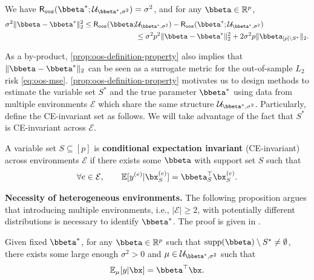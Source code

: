 \documentclass[10pt]{article}
\numberwithin{equation}{section}
\newcommand*{\supp}{\mathrm{supp}}
\newcommand{\aosversion}[2]{\iftoggle{vaos}{#1}{#2}}
\newcommand{\blue}[1]{{\color{blue} #1}}
\begin{document}
{\begin{proposition} \label{prop:oos-definition-property} We have $\mathsf{R}_{\mathtt{oos}}(\bbeta^*;\mathcal{U}_{\bbeta^*, \sigma^2})=\sigma^2$, and for any $\bbeta \in \mathbb{R}^p$,
\begin{align}
\label{eq:optimal-beta-s-star}
\begin{split}
\sigma^2 \|\bbeta - \bbeta^*\|_2^2 \le \mathsf{R}_{\mathtt{oos}}(\bbeta;&\mathcal{U}_{\bbeta^*,\sigma^2}) - \mathsf{R}_{\mathtt{oos}}(\bbeta^*;\mathcal{U}_{\bbeta^*, \sigma^2}) \\
&\le \sigma^2 p^2 \|\bbeta-\bbeta^*\|_2^2 + 2 \sigma^2 p \|\bbeta_{[p]\setminus S^*}\|_2.
\end{split}
\end{align}
\end{proposition}
As a by-product, \cref{prop:oos-definition-property} also implies that $\|\bbeta - \bbeta^*\|_2$ can be seen as a surrogate metric for the out-of-sample $L_2$ risk \eqref{eq:oos-mse}. \cref{prop:oos-definition-property} motivates us to design methods to estimate the variable set $S^*$  and the true parameter $\bbeta^*$  using data from multiple environments $\mathcal{E}$ which share the same structure $\mathcal{U}_{\bbeta^*,\sigma^2}$. Particularly, define the CE-invariant set as follows. We will take advantage of the fact that $S^*$ is CE-invariant across $\mathcal{E}$.

\begin{definition} A variable set $S \subseteq [p]$ is \textbf{conditional expectation invariant} (CE-invariant) across environments $\mathcal{E}$ if there exists some $\bbeta$ with support set $S$ such that
\begin{align}
\label{eq:ce-invariant}
    \forall e\in \mathcal{E}, ~~~~~~ \mathbb{E} [y^{(e)}|\bx_{S}^{(e)}] = \bbeta_S^\top \bx_{S}^{(e)}.
\end{align}
\end{definition} 

\noindent \textbf{Necessity of heterogeneous environments. } The following proposition argues that introducing multiple environments, i.e., $|\mathcal{E}| \ge 2$, with potentially different distributions is necessary to identify $\bbeta^*$. The proof is given in \aosversion{Appendix~\blue{B.2}}{\cref{prop:necessary-multiple-envs-proof}}.

\begin{proposition} \label{prop:necessary-multiple-envs} Given fixed $\bbeta^*$, for any $\bbeta \in \mathbb{R}^p$ such that $\supp(\bbeta) \setminus S^* \neq \emptyset$, there exists some large enough $\sigma^2>0$ and $\mu \in \mathcal{U}_{\bbeta^*, \sigma^2}$ such that
\begin{align*}
    \mathbb{E}_{\mu}[y|\bx] = \bbeta^\top \bx.
\end{align*}
\end{proposition}

}
\end{document}
